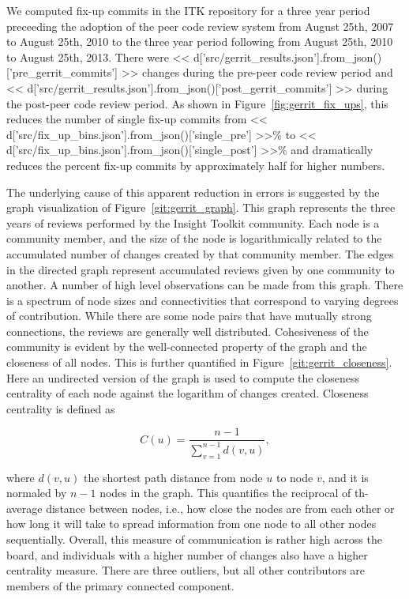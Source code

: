 \documentclass{frontiersENG} %
\begin{document}
We computed fix-up commits in the ITK repository for a three year period
preceeding the adoption of the peer code review system from August 25th, 2007
to August 25th, 2010 to the three year period following from August 25th, 2010
to August 25th, 2013.  There were
<< d['src/gerrit_results.json'].from_json()['pre_gerrit_commits'] >>
changes during the pre-peer code review period and
<< d['src/gerrit_results.json'].from_json()['post_gerrit_commits'] >>
during the post-peer code review period.  As shown in
Figure~\ref{fig:gerrit_fix_ups}, this reduces the number of
single fix-up commits from <<
d['src/fix_up_bins.json'].from_json()['single_pre'] >>\%
to << d['src/fix_up_bins.json'].from_json()['single_post'] >>\% and
dramatically reduces the percent fix-up commits by approximately half for
higher numbers.

The underlying cause of this apparent reduction in errors is suggested by the
graph visualization of Figure~\ref{git:gerrit_graph}. This graph represents
the three years of reviews performed by the Insight Toolkit community. Each
node is a community member, and the size of the node is logarithmically
related to the accumulated number of changes created by that community member.
The edges in the directed graph represent accumulated reviews given by one
community to another. A number of high level observations can be made from
this graph.  There is a spectrum of node sizes and connectivities that
correspond to varying degrees of contribution. While there are some node pairs
that have mutually strong connections, the reviews are generally well
distributed.  Cohesiveness of the community is evident by the well-connected
property of the graph and the closeness of all nodes.  This is further
quantified in Figure~\ref{git:gerrit_closeness}.  Here an undirected version
of the graph is used to compute the closeness centrality of each node against
the logarithm of changes created.  Closeness centrality is defined
as\cite{Freeman1979}

\begin{equation}
   C(u) = \frac{n - 1}{\sum_{v=1}^{n-1} d(v, u)},
\end{equation}

where $d(v, u)$ the shortest path distance from node $u$ to node $v$, and it
is normaled by $n-1$ nodes in the graph. This quantifies the reciprocal of th-
average distance between nodes, i.e., how close the nodes are from each other
or how long it will take to spread information from one node to all other
nodes sequentially\cite{Newman2005}. Overall, this measure of communication is
rather high across the board, and individuals with a higher
number of changes also have a higher centrality measure.  There are three
outliers, but all other contributors are members of the primary connected
component.
\end{document}
